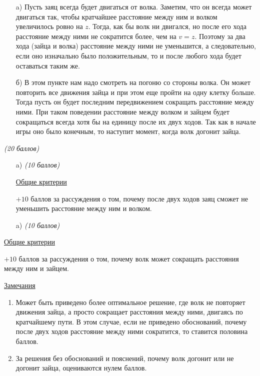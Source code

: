 \solutionSection
\begin{enumerate}

    \item[a)] Пусть заяц всегда будет двигаться от волка. Заметим, что он всегда может двигаться так, чтобы кратчайшее расстояние между ним и волком увеличилось ровно на $z$. Тогда, как бы волк ни двигался, но после его хода расстояние между ними не сократится более, чем на $v = z$. Поэтому за два хода (зайца и волка) расстояние между ними не уменьшится, а следовательно, если оно изначально было положительным, то и после любого хода будет оставаться таким же.
	
    \item[б)] В этом пункте нам надо смотреть на погоню со стороны волка. Он может повторить все движения зайца и при этом еще пройти на одну клетку больше. Тогда пусть он будет последним передвижением сокращать расстояние между ними. При таком поведении расстояние между волком и зайцем будет сокращаться всегда хотя бы на единицу после их двух ходов. Так как в начале игры оно было конечным, то наступит момент, когда волк догонит зайца.
    
\end{enumerate}

\additionalCriteria

\textit{(20 баллов)}

\begin{enumerate}

    \item[a)] \textit{(10 баллов)}
	
	\underline{Общие критерии}

	$+10$ баллов за рассуждения о том, почему после двух ходов
	заяц сможет не уменьшить расстояние между ним и волком.

	\item[a)] \textit{(10 баллов)}

\end{enumerate}
    
	\underline{Общие критерии}

	$+10$ баллов за рассуждения о том, почему волк может
	сокращать расстояния между ним и зайцем.
	
	\underline{Замечания}
\begin{enumerate}
	\item Может быть приведено более оптимальное решение, где
	волк не повторяет движения зайца, а просто сокращает расстояния
	между ними, двигаясь по кратчайшему пути. В этом случае, если
	не приведено обоснований, почему после двух ходов расстояние между
	ними сократится, то ставится половина баллов.
	
	\item За решения без обоснований и пояснений, почему волк
	догонит или не догонит зайца, оцениваются нулем баллов.
\end{enumerate}	